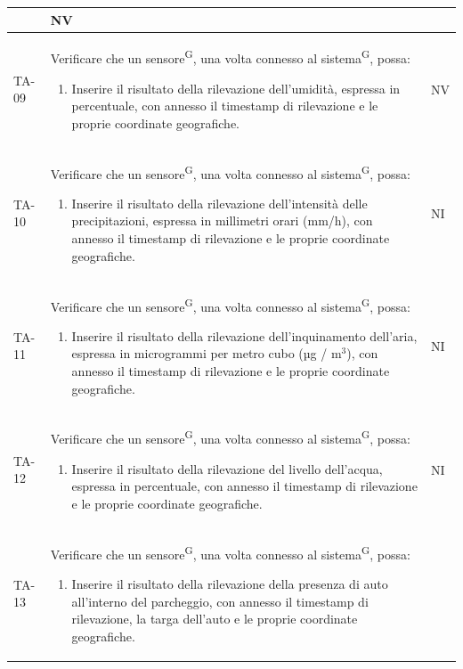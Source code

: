 \documentclass[8pt]{article}
\newcommand{\glossterm}[1]{#1\textsuperscript{G}} %
\begin{document}
\begin{longtable}{|>{\centering}p{2cm}|>{\RaggedRight}m{12cm}|>{\centering\arraybackslash}p{2cm}|}
\begin{enumerate}
    \end{enumerate}
    & NV \\
    \hline
    TA-09 &
    Verificare che un \glossterm{sensore}, una volta connesso al \glossterm{sistema}, possa:
    \begin{enumerate}
    \item Inserire il risultato della rilevazione dell’umidità, espressa in percentuale, con annesso il timestamp di rilevazione e le proprie coordinate geografiche.
    \end{enumerate}
    & NV \\
    \hline
    TA-10 &
    Verificare che un \glossterm{sensore}, una volta connesso al \glossterm{sistema}, possa:
    \begin{enumerate}
    \item Inserire il risultato della rilevazione dell'intensità delle precipitazioni, espressa in millimetri orari (mm/h), con annesso il timestamp di rilevazione e le proprie coordinate geografiche.
    \end{enumerate}
    & NI \\
    \hline
    TA-11 &
    Verificare che un \glossterm{sensore}, una volta connesso al \glossterm{sistema}, possa:
    \begin{enumerate}
    \item Inserire il risultato della rilevazione dell’inquinamento dell'aria, espressa in microgrammi per metro cubo (µg / $\mbox{m}^{\mbox{3}}$), con annesso il timestamp di rilevazione e le proprie coordinate geografiche.
    \end{enumerate}
    & NI \\
    \hline
    TA-12 &
    Verificare che un \glossterm{sensore}, una volta connesso al \glossterm{sistema}, possa:
    \begin{enumerate}
    \item Inserire il risultato della rilevazione del livello dell'acqua, espressa in percentuale, con annesso il timestamp di rilevazione e le proprie coordinate geografiche.
    \end{enumerate}
    & NI \\
    \hline
    TA-13 &
    Verificare che un \glossterm{sensore}, una volta connesso al \glossterm{sistema}, possa:
    \begin{enumerate}
    \item  Inserire il risultato della rilevazione della presenza di auto all’interno del
        parcheggio, con annesso il timestamp di rilevazione, la targa dell'auto e le proprie coordinate geografiche. 

\end{enumerate}
\end{longtable}
\end{document}
